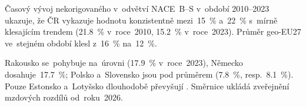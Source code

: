 Časový vývoj nekorigovaného  v~odvětví \acs{NACE}~B--S v~období 2010--2023 ukazuje, že \ac{ČR} vykazuje hodnotu konzistentně mezi~\SI{15}{\percent} a~\SI{22}{\percent} s~mírně klesajícím trendem (\SI{21,8}{\percent} v~roce~2010, \SI{15,2}{\percent} v~roce~2023). Průměr \acs{geo-EU27} ve~stejném období klesl z~\SI{16}{\percent} na~\SI{12}{\percent}.

Rakousko se~pohybuje na~úrovni  (\SI{17,9}{\percent} v~roce~2023), Německo dosahuje~\SI{17,7}{\percent}; Polsko a~Slovensko jsou pod průměrem (\SI{7,8}{\percent}, resp.~\SI{8,1}{\percent}). Pouze Estonsko a~Lotyšsko dlouhodobě převyšují . Směrnice  ukládá zveřejnění mzdových rozdílů od~roku~2026.~\cite{Consilium_PayTransparency_2023}


